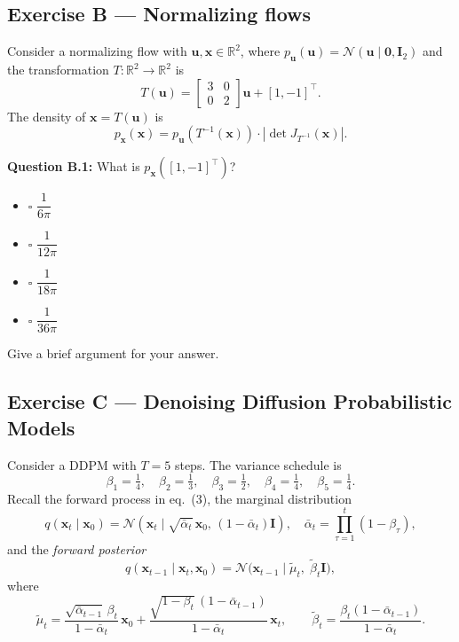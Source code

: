 \documentclass[12pt,a4paper]{article}
\newcommand{\N}{\mathcal{N}}
\begin{document}
\vspace{5cm}

\newpage
\subsection*{Exercise B --- Normalizing flows}

Consider a normalizing flow with $\mathbf{u},\mathbf{x}\in\mathbb{R}^2$, where
$p_{\mathbf{u}}(\mathbf{u})=\N(\mathbf{u}\mid\mathbf{0},\mathbf{I}_2)$ and the transformation
$T:\mathbb{R}^2\to\mathbb{R}^2$ is
\[
  T(\mathbf{u}) = \begin{bmatrix}3&0\\0&2\end{bmatrix}\mathbf{u} + [1,-1]^\top. \tag{2}
\]
The density of $\mathbf{x}=T(\mathbf{u})$ is
\[
  p_{\mathbf{x}}(\mathbf{x}) = p_{\mathbf{u}}(T^{-1}(\mathbf{x}))\cdot|\det J_{T^{-1}}(\mathbf{x})|. \tag{3}
\]

\textbf{Question B.1:} What is $p_{\mathbf{x}}([1,-1]^\top)$?

\begin{itemize}[noitemsep,label={}]
  \item[\textbf{A}] $\square$ \quad $\dfrac{1}{6\pi}$
  \item[\textbf{B}] $\square$ \quad $\dfrac{1}{12\pi}$
  \item[\textbf{C}] $\square$ \quad $\dfrac{1}{18\pi}$
  \item[\textbf{D}] $\square$ \quad $\dfrac{1}{36\pi}$
\end{itemize}

Give a brief argument for your answer.

\vspace{6cm}

\newpage
\subsection*{Exercise C --- Denoising Diffusion Probabilistic Models}

Consider a DDPM with $T=5$ steps.  The variance schedule is
\[
  \beta_1=\tfrac{1}{4},\quad\beta_2=\tfrac{1}{3},\quad\beta_3=\tfrac{1}{2},\quad
  \beta_4=\tfrac{1}{4},\quad\beta_5=\tfrac{1}{4}.
\]
Recall the forward process in eq.~(3), the marginal distribution
\[
  q(\mathbf{x}_t\mid\mathbf{x}_0) = \N(\mathbf{x}_t\mid\sqrt{\bar\alpha_t}\,\mathbf{x}_0,\,(1-\bar\alpha_t)\mathbf{I}),
  \quad \bar\alpha_t=\prod_{\tau=1}^t(1-\beta_\tau), \tag{4}
\]
and the \emph{forward posterior}
\[
  q(\mathbf{x}_{t-1}\mid\mathbf{x}_t,\mathbf{x}_0) = \N\!\bigl(\mathbf{x}_{t-1}\mid\tilde\mu_t,\;\tilde\beta_t\mathbf{I}\bigr), \tag{5}
\]
where
\[
  \tilde\mu_t = \frac{\sqrt{\bar\alpha_{t-1}}\,\beta_t}{1-\bar\alpha_t}\,\mathbf{x}_0
              + \frac{\sqrt{1-\beta_t}\,(1-\bar\alpha_{t-1})}{1-\bar\alpha_t}\,\mathbf{x}_t,
  \qquad
  \tilde\beta_t = \frac{\beta_t(1-\bar\alpha_{t-1})}{1-\bar\alpha_t}. \tag{6}
\]
\end{document}

